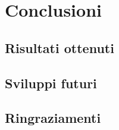 \section{Conclusioni}
\label{sec:concl}

\subsection{Risultati ottenuti}

\subsection{Sviluppi futuri}

\subsection{Ringraziamenti}